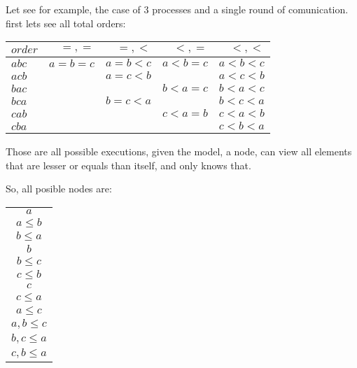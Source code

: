 \documentclass{tufte-book} %
\begin{document}
Let see for example, the case of 3 processes and a single round of comunication.\\


first lets see all total orders:

\begin{tabular}{ l | r r r r}
  \hline                       
$ order$ & $=,=$ & $=,<$ & $<,=$ & $<,<$\\
  \hline                       
$a b c$ & $a=b=c$ & $a=b<c$ & $a<b=c$ & $a<b<c$\\
$a c b$ &         & $a=c<b$ &         & $a<c<b$\\
$b a c$ &         &         & $b<a=c$ & $b<a<c$\\
$b c a$ &         & $b=c<a$ &         & $b<c<a$\\
$c a b$ &         &         & $c<a=b$ & $c<a<b$\\
$c b a$ &         &         &         & $c<b<a$\\
  \hline  
\end{tabular}

Those are all possible executions, given the model, a node, can view all elements that are lesser or equals than itself, and only knows that.

So, all posible nodes are:
\begin{tabular}{ c}
  \hline                       
$a$ \\
$a \le b$ \\
$b \le a$ \\
$b$ \\
$b \le c$ \\
$c \le b$ \\
$c$ \\
$c \le a$ \\
$a \le c$ \\
$ {a,b} \le c$ \\
$ {b,c} \le a$ \\
$ {c,b} \le a$ \\
  \hline  
\end{tabular}
\end{document}
